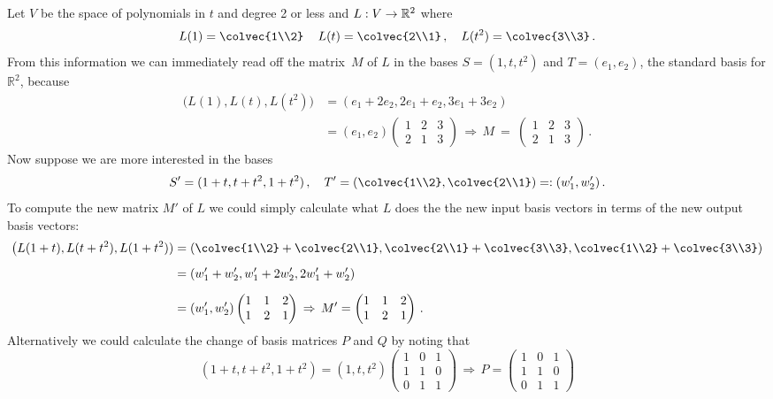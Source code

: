 \begin{example}
Let $V$ be the space of polynomials in $t$ and degree 2 or less and $\sloppy{L:V\to {\mathbb R}^2}$ where
\[
L(1)=\colvec{1\\2}\, \quad L(t)=\colvec{2\\1}\, ,\quad L(t^2)=\colvec{3\\3}\, .
\]
From this information we can immediately read off the matrix~$M$ of $L$ in the bases $S=(1,t,t^2)$ and $T=(e_1,e_2)$, the standard basis for ${\mathbb R}^2$,
because
\begin{align*}
\big(L(1),L(t),L(t^2)\big)
&=(e_1+2 e_2,2e_1+e_2, 3 e_1+3e_2)\\[2mm]
&=(e_1,e_2)\begin{pmatrix}1&2&3\\2&1&3\end{pmatrix}\, \Rightarrow \, M\ =\ 
\begin{pmatrix}1&2&3\\2&1&3\end{pmatrix}\, .
\end{align*}
Now suppose we are more interested in the bases \[S'=(1+t,t+t^2,1+t^2)\, , \quad T'=\left(\colvec{1\\2},\colvec{2\\1}\right)=:(w_1',w_2')\, .\]
To compute the new matrix $M'$ of $L$ we could simply calculate what $L$ does the the new input basis vectors in terms of the new output basis vectors:
\begin{align*}
\big(L(1+t),L(t+t^2),L(1+t^2))&=\left(\colvec{1\\2}+\colvec{2\\1},
\colvec{2\\1}+\colvec{3\\3},\colvec{1\\2}+\colvec{3\\3}\right)\\[2mm]
&=(w'_1+w'_2,w'_1+2w'_2,2w'_1+w'_2)\\[2mm]
&=(w'_1,w'_2)
\begin{pmatrix}1&1&2\\1&2&1\end{pmatrix}\, \Rightarrow \, 
M'=\begin{pmatrix}1&1&2\\1&2&1\end{pmatrix}\, .
\end{align*}
Alternatively we could calculate the change of basis matrices $P$ and $Q$ by noting that
\[
(1+t,t+t^2,1+t^2)=(1,t,t^2)\begin{pmatrix}1&0&1\\1&1&0\\0&1&1\end{pmatrix}\, \Rightarrow\, P=\begin{pmatrix}1&0&1\\1&1&0\\0&1&1\end{pmatrix}
\]
\end{example}
